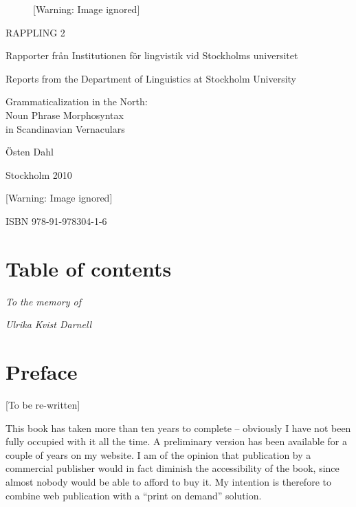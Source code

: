 \begin{figure}[h]

 [Warning: Image ignored] %

\end{figure}

RAPPLING 2

\begin{stylePa}
Rapporter från Institutionen för lingvistik vid Stockholms universitet

\end{stylePa}

\begin{stylePa}
Reports from the Department of Linguistics at Stockholm University

\end{stylePa}

\hypertarget{Toc264376056}{}Grammaticalization in the North:\\
Noun Phrase Morphosyntax\\
in Scandinavian Vernaculars

Östen Dahl

Stockholm 2010

  [Warning: Image ignored] %
 

ISBN 978-91-978304-1-6

\chapter[Table of contents]{\rmfamily\bfseries Table of contents}

\itshape
To the memory of

\itshape
Ulrika Kvist Darnell

\chapter[Preface]{\rmfamily\bfseries Preface}

[To be re-written]

\begin{styleBodyTextFirst}
This book has taken more than ten years to complete – obviously I have not been fully occupied with it all the time. A preliminary version has been available for a couple of years on my website. I am of the opinion that publication by a commercial publisher would in fact diminish the accessibility of the book, since almost nobody would be able to afford to buy it. My intention is therefore to combine web publication with a “print on demand” solution. 

\end{styleBodyTextFirst}

